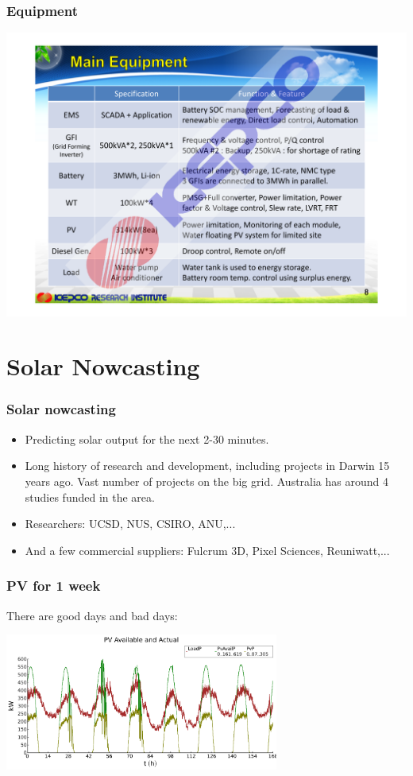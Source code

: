 \documentclass{beamer}
\begin{document}
\begin{frame}\frametitle{Equipment}
\includegraphics[width=\hsize]{KEPCO-kit.pdf}
\end{frame}


\section{Solar Nowcasting}

\begin{frame}\frametitle{Solar nowcasting}
  \begin{itemize}
  \item Predicting solar output for the next 2-30 minutes.
    \pause
  \item Long history of research and development,
    including projects in Darwin 15 years ago.
    Vast number of projects on the big grid.
    Australia has around 4 studies funded in the area.
    \pause
  \item Researchers: UCSD, NUS, CSIRO, ANU,...
    \pause
  \item   And a few commercial suppliers:
    Fulcrum 3D, Pixel Sciences, Reuniwatt,...
  \end{itemize}
\end{frame}

\begin{frame}\frametitle{PV for 1 week}
There are good days and bad days:

\includegraphics[width=9cm]{figPv1.pdf}
\end{frame}
\end{document}
